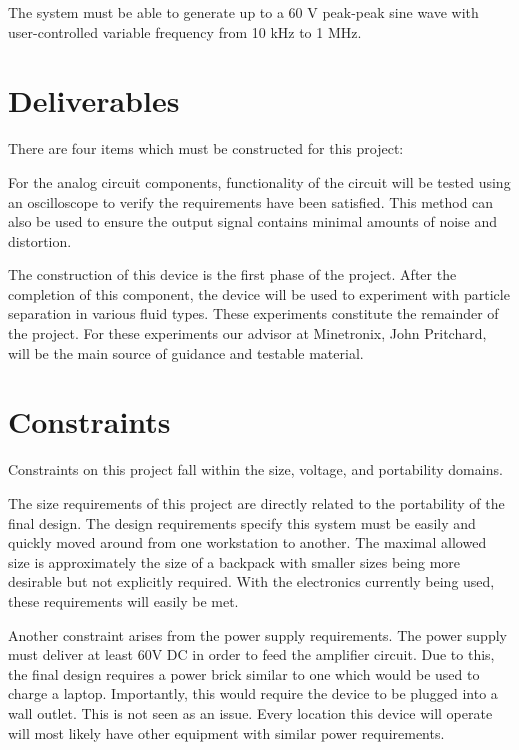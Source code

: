 \documentclass{article}	%
\begin{document}
\begin{multicols}{2}
The system must be able to generate up to a 60 V peak-peak sine wave with
user-controlled variable frequency from 10 kHz to 1 MHz. 

\section{Deliverables}
There are four items which must be constructed for this project:

For the analog circuit components,
functionality of the circuit will be tested
using an oscilloscope to verify 
the requirements have been satisfied.
This method can also be used to ensure 
the output signal contains minimal amounts of noise and distortion. 

The construction of this device is the first phase of the project.
After the completion of this component,
the device will be used 
to experiment with particle separation in various fluid types.
These experiments constitute the remainder of the project.
For these experiments our advisor at Minetronix, John Pritchard, 
will be the main source of guidance and testable material. 

\section{Constraints}
Constraints on this project fall within the size, voltage, and portability domains.

The size requirements of this project are directly related 
to the portability of the final design.
The design requirements specify this system must be easily and quickly
 moved around from one workstation to another.
The maximal allowed size is approximately 
the size of a backpack 
with smaller sizes being more desirable
but not explicitly required.
With the electronics currently being used,
these requirements will easily be met.

Another constraint arises from the power supply requirements.
The power supply must deliver at least 60V DC in order to feed the amplifier circuit. 
Due to this, the final design requires a power brick
similar to one which would be used to charge a laptop.
Importantly, this would require the device to be plugged into a wall outlet.
This is not seen as an issue.
Every location this device will operate 
will most likely have other equipment with similar power requirements.


\end{multicols}
\end{document}
